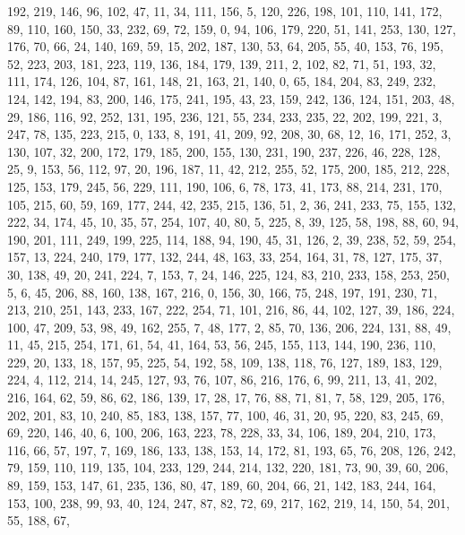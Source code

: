 \begin{DoxyCode}
       192, 219, 146, 96, 102, 47, 11, 34, 111, 156, 5, 120, 226, 198, 101, 110, 141, 172, 89, 110, 160, 150, 33,
       232, 69, 72, 159, 0, 94, 106, 179, 220, 51, 141, 253, 130, 127, 176, 70, 66, 24, 140, 169, 59, 15, 202, 187,
       130, 53, 64, 205, 55, 40, 153, 76, 195, 52, 223, 203, 181, 223, 119, 136, 184, 179, 139, 211, 2, 102, 82,
       71, 51, 193, 32, 111, 174, 126, 104, 87, 161, 148, 21, 163, 21, 140, 0, 65, 184, 204, 83, 249, 232, 124, 142,
       194, 83, 200, 146, 175, 241, 195, 43, 23, 159, 242, 136, 124, 151, 203, 48, 29, 186, 116, 92, 252, 131,
       195, 236, 121, 55, 234, 233, 235, 22, 202, 199, 221, 3, 247, 78, 135, 223, 215, 0, 133, 8, 191, 41, 209, 92,
       208, 30, 68, 12, 16, 171, 252, 3, 130, 107, 32, 200, 172, 179, 185, 200, 155, 130, 231, 190, 237, 226, 46,
       228, 128, 25, 9, 153, 56, 112, 97, 20, 196, 187, 11, 42, 212, 255, 52, 175, 200, 185, 212, 228, 125, 153, 179,
       245, 56, 229, 111, 190, 106, 6, 78, 173, 41, 173, 88, 214, 231, 170, 105, 215, 60, 59, 169, 177, 244, 42,
       235, 215, 136, 51, 2, 36, 241, 233, 75, 155, 132, 222, 34, 174, 45, 10, 35, 57, 254, 107, 40, 80, 5, 225, 8,
       39, 125, 58, 198, 88, 60, 94, 190, 201, 111, 249, 199, 225, 114, 188, 94, 190, 45, 31, 126, 2, 39, 238, 52,
       59, 254, 157, 13, 224, 240, 179, 177, 132, 244, 48, 163, 33, 254, 164, 31, 78, 127, 175, 37, 30, 138, 49, 20,
       241, 224, 7, 153, 7, 24, 146, 225, 124, 83, 210, 233, 158, 253, 250, 5, 6, 45, 206, 88, 160, 138, 167, 216,
       0, 156, 30, 166, 75, 248, 197, 191, 230, 71, 213, 210, 251, 143, 233, 167, 222, 254, 71, 101, 216, 86, 44,
       102, 127, 39, 186, 224, 100, 47, 209, 53, 98, 49, 162, 255, 7, 48, 177, 2, 85, 70, 136, 206, 224, 131, 88,
       49, 11, 45, 215, 254, 171, 61, 54, 41, 164, 53, 56, 245, 155, 113, 144, 190, 236, 110, 229, 20, 133, 18, 157,
       95, 225, 54, 192, 58, 109, 138, 118, 76, 127, 189, 183, 129, 224, 4, 112, 214, 14, 245, 127, 93, 76, 107,
       86, 216, 176, 6, 99, 211, 13, 41, 202, 216, 164, 62, 59, 86, 62, 186, 139, 17, 28, 17, 76, 88, 71, 81, 7, 58,
       129, 205, 176, 202, 201, 83, 10, 240, 85, 183, 138, 157, 77, 100, 46, 31, 20, 95, 220, 83, 245, 69, 69,
       220, 146, 40, 6, 100, 206, 163, 223, 78, 228, 33, 34, 106, 189, 204, 210, 173, 116, 66, 57, 197, 7, 169, 186,
       133, 138, 153, 14, 172, 81, 193, 65, 76, 208, 126, 242, 79, 159, 110, 119, 135, 104, 233, 129, 244, 214, 132,
       220, 181, 73, 90, 39, 60, 206, 89, 159, 153, 147, 61, 235, 136, 80, 47, 189, 60, 204, 66, 21, 142, 183,
       244, 164, 153, 100, 238, 99, 93, 40, 124, 247, 87, 82, 72, 69, 217, 162, 219, 14, 150, 54, 201, 55, 188, 67,

\end{DoxyCode}
